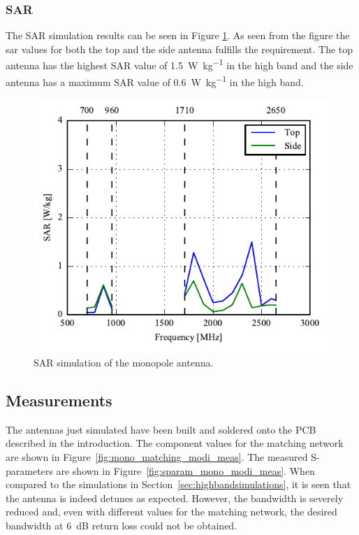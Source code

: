 \FloatBarrier
\subsubsection{SAR}
The SAR simulation results can be seen in Figure \ref{fig:sar_mono_modi}. As seen from the figure the sar values for both the top and the side antenna fulfills the requirement. The top antenna has the highest SAR value of \SI{1.5}{W\per kg} in the high band and the side antenna has a maximum SAR value of \SI{0.6}{W\per kg} in the high band. 
\begin{figure}[htbp]
    \centering
    \includegraphics{img/tech_sol/monopole/highband/ue/sar/sar.pdf}
    \caption{SAR simulation of the monopole antenna.}
    \label{fig:sar_mono_modi}
\end{figure}

\FloatBarrier
\subsection{Measurements}
The antennas just simulated have been built and soldered onto the PCB described in the introduction. The component values for the matching network are shown in Figure~\ref{fig:mono_matching_modi_meas}. The measured S-parameters are shown in Figure~\ref{fig:sparam_mono_modi_meas}. When compared to the simulations in Section~\ref{sec:highbandsimulations}, it is seen that the antenna is indeed detunes as expected. However, the bandwidth is severely reduced and, even with different values for the matching network, the desired bandwidth at \SI{6}{dB} return loss could not be obtained.

